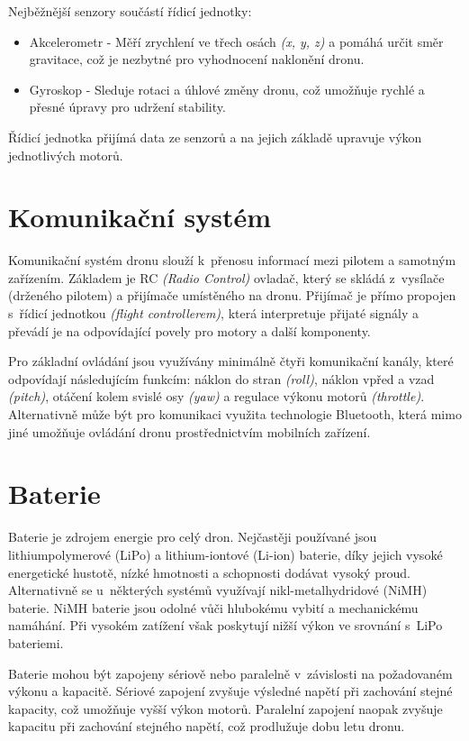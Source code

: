 \documentclass[12pt]{report}
\begin{document}
Nejběžnější senzory součástí řídicí jednotky:
\begin{itemize}
	\item Akcelerometr -  Měří zrychlení ve třech osách \textit{(x, y, z)} a pomáhá určit směr gravitace, což je nezbytné pro vyhodnocení naklonění dronu.
	\item Gyroskop - Sleduje rotaci a úhlové změny dronu, což umožňuje rychlé a přesné úpravy pro udržení stability.
\end{itemize}

Řídicí jednotka přijímá data ze senzorů a na jejich základě upravuje výkon jednotlivých motorů. \cite{mainbook}

\section[Komunikační systém]{Komunikační systém}
Komunikační systém dronu slouží k~přenosu informací mezi pilotem a samotným zařízením. Základem je RC \textit{(Radio Control)} ovladač, který se skládá z~vysílače (drženého pilotem) a přijímače umístěného na dronu. Přijímač je přímo propojen s~řídicí jednotkou \textit{(flight controllerem)}, která interpretuje přijaté signály a převádí je na odpovídající povely pro motory a další komponenty.

Pro základní ovládání jsou využívány minimálně čtyři komunikační kanály, které odpovídají následujícím funkcím: náklon do stran \textit{(roll)}, náklon vpřed a vzad \textit{(pitch)}, otáčení kolem svislé osy \textit{(yaw)} a regulace výkonu motorů \textit{(throttle)}. Alternativně může být pro komunikaci využita technologie Bluetooth, která mimo jiné umožňuje ovládání dronu prostřednictvím mobilních zařízení.

\section[Baterie]{Baterie}

Baterie je zdrojem energie pro celý dron. Nejčastěji používané jsou lithiumpolymerové (LiPo) a lithium-iontové (Li-ion) baterie, díky jejich vysoké energetické hustotě, nízké hmotnosti a schopnosti dodávat vysoký proud. Alternativně se u~některých systémů využívají nikl-metalhydridové (NiMH) baterie. NiMH baterie jsou odolné vůči hlubokému vybití a mechanickému namáhání. Při vysokém zatížení však poskytují nižší výkon ve srovnání s~LiPo bateriemi.

Baterie mohou být zapojeny sériově nebo paralelně v~závislosti na požadovaném výkonu a kapacitě. Sériové zapojení zvyšuje výsledné napětí při zachování stejné kapacity, což umožňuje vyšší výkon motorů. Paralelní zapojení naopak zvyšuje kapacitu při zachování stejného napětí, což prodlužuje dobu letu dronu.
\end{document}
